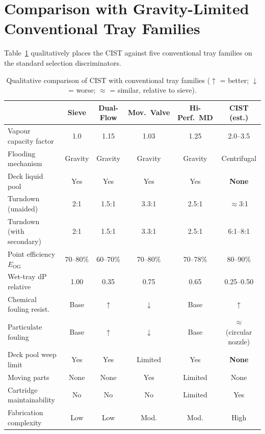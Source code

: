 \documentclass[11pt,letterpaper]{article}
\newcommand{\Eog}{E_{\mathrm{OG}}}
\begin{document}
\section{Comparison with Gravity-Limited Conventional Tray Families}
\label{sec:comparison}

Table~\ref{tab:comparison} qualitatively places the CIST against five
conventional tray families on the standard selection discriminators.

\begin{table}[H]
\centering
\caption{Qualitative comparison of CIST with conventional tray families
  ($\uparrow$ = better; $\downarrow$ = worse; $\approx$ = similar, relative to sieve).}
\label{tab:comparison}
\small
\begin{tabular}{lccccc}
\toprule
 & Sieve & Dual-Flow & Mov.\ Valve & Hi-Perf.\ MD & CIST (est.)\\
\midrule
Vapour capacity factor   & 1.0 & 1.15 & 1.03 & 1.25 & 2.0--3.5\\
Flooding mechanism       & Gravity & Gravity & Gravity & Gravity & Centrifugal\\
Deck liquid pool         & Yes & Yes & Yes & Yes & \textbf{None}\\
Turndown (unaided)       & 2:1 & 1.5:1 & 3.3:1 & 2.5:1 & $\approx$3:1\\
Turndown (with secondary)& 2:1 & 1.5:1 & 3.3:1 & 2.5:1 & 6:1--8:1\\
Point efficiency $\Eog$  & 70--80\% & 60--70\% & 70--80\% & 70--78\% & 80--90\%\\
Wet-tray dP relative     & 1.00 & 0.35 & 0.75 & 0.65 & 0.25--0.50\\
Chemical fouling resist.\ & Base & $\uparrow$ & $\downarrow$ & Base & $\uparrow$\\
Particulate fouling      & Base & $\uparrow$ & $\downarrow$ & Base & $\approx$ (circular nozzle)\\
Deck pool weep limit     & Yes & Yes & Limited & Yes & \textbf{None}\\
Moving parts             & None & None & Yes & Limited & None\\
Cartridge maintainability& No & No & No & Limited & Yes\\
Fabrication complexity   & Low & Low & Mod. & Mod. & High\\
\bottomrule
\end{tabular}
\end{table}
\end{document}
